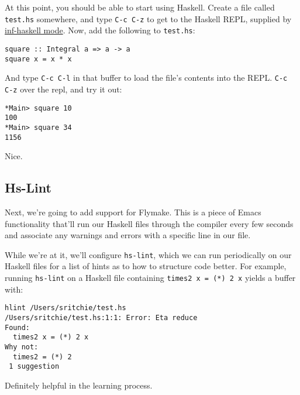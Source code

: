 \documentclass[11pt]{article}
\begin{document}
At this point, you should be able to start using Haskell. Create a file called \texttt{test.hs} somewhere, and type \texttt{C-c C-z} to get to the Haskell REPL, supplied by \href{http://www.haskell.org/haskellwiki/Haskell_mode_for_Emacs#inf-haskell.el:_the_best_thing_since_the_breadknife}{inf-haskell mode}. Now, add the following to \texttt{test.hs}:


\begin{verbatim}
square :: Integral a => a -> a
square x = x * x
\end{verbatim}

And type \texttt{C-c C-l} in that buffer to load the file's contents into the REPL. \texttt{C-c C-z} over the repl, and try it out:


\begin{verbatim}
*Main> square 10
100
*Main> square 34
1156
\end{verbatim}

Nice.
\subsection{Hs-Lint}
\label{sec-1-2}


Next, we're going to add support for Flymake. This is a piece of Emacs functionality that'll run our Haskell files through the compiler every few seconds and associate any warnings and errors with a specific line in our file.

While we're at it, we'll configure \texttt{hs-lint}, which we can run periodically on our Haskell files for a list of hints as to how to structure code better. For example, running \texttt{hs-lint} on a Haskell file containing \texttt{times2 x = (*) 2 x} yields a buffer with:


\begin{verbatim}
hlint /Users/sritchie/test.hs
/Users/sritchie/test.hs:1:1: Error: Eta reduce
Found:
  times2 x = (*) 2 x
Why not:
  times2 = (*) 2
 1 suggestion
\end{verbatim}

Definitely helpful in the learning process.
\end{document}
